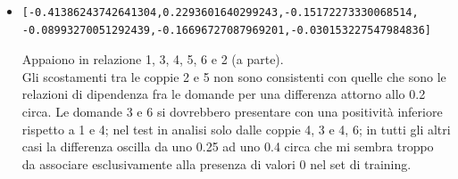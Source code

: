 \begin{itemize}
\item \begin{verbatim}[-0.41386243742641304,0.2293601640299243,-0.15172273330068514,
-0.08993270051292439,-0.16696727087969201,-0.030153227547984836]\end{verbatim}
Appaiono in relazione 1, 3, 4, 5, 6 e 2 (a parte).\\
Gli scostamenti tra le coppie 2 e 5 non sono consistenti con quelle che sono le relazioni di dipendenza fra le domande per una differenza attorno allo 0.2 circa.
Le domande 3 e 6 si dovrebbero presentare con una positivit\`a inferiore rispetto a 1 e 4; nel test in analisi solo dalle coppie 4, 3 e 4, 6; in tutti gli altri casi la differenza oscilla da uno 0.25 ad uno 0.4 circa che mi sembra troppo da associare esclusivamente alla presenza di valori 0 nel set di training.
\end{itemize}


